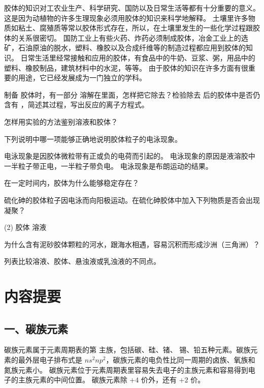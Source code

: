 胶体的知识对工农业生产、科学研究、国防以及日常生活等都有十分重要的意义。
这是因为动植物的许多生理现象必须用胶体的知识来科学地解释。
土壤里许多物质如粘土、腐殖质等常以胶体形式存在，所以，在土壤里发生的一些化学过程跟胶体的关系很密切。
国防工业上有些火药、炸药必须制成胶体，冶金工业上的选矿，石油原油的脱水，塑料、橡胶以及合成纤维等的制造过程都应用到胶体的知识。
日常生活里经常接触和应用的胶体，有食品中的牛奶、豆浆、粥，用品中的塑料、橡胶制品，建筑材料中的水泥，等等。
由于胶体的知识在许多方面有很重要的用途，它已经发展成为一门独立的学科。

\begin{Practice}[习题]
\begin{question}
  \item 制备  胶体时，有一部分  溶解在里面，怎样把它除去？检验除去  后的胶体中是否仍含有 ，简述其过程，写出反应的离子方程式。
  \item 怎样用实验的方法鉴别溶液和胶体？
  \item 下列说明中哪一项能够正确地说明胶体粒子的电泳现象。
  \begin{tasks}
    \task 电泳现象是因胶体微粒带有正或负的电荷而引起的。
    \task 电泳现象的原因是液溶胶中一半粒子带正电，一半粒子带负电。
    \task 电泳现象是布朗运动的结果。
  \end{tasks}
  \item 在一定时间内，胶体为什么能够稳定存在？
  \item 硫化砷的胶体粒子因电泳而向阳极运动。在硫化砷胶体中加入下列物质是否会出现凝聚？
  \begin{tasks}(2)
    \task {} 胶体
    \task {} 溶液
  \end{tasks}
  \item 为什么含有泥砂胶体颗粒的河水，跟海水相遇，容易沉积而形成沙洲（三角洲）？
  \item 列表比较溶液、胶体、悬浊液或乳浊液的不同点。
\end{question}
\end{Practice}

\section*{内容提要}
\setcounter{subsection}{0}
\subsection*{一、碳族元素}
碳族元素属于元素周期表的第  主族，包括碳、硅、锗、 锡、铅五种元素。碳族元素的最外层电子排布式是 $ns^2np^2$，碳族元素的电负性比同一周期的卤族、氧族和氮族元素小。
碳族元素位于元素周期表里容易失去电子的主族元素和容易得到电子的主族元素的中间位置。
碳族元素除 $+4$ 价外，还有 $+2$ 价。

